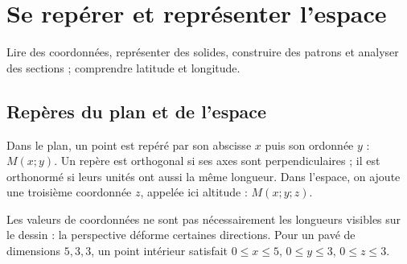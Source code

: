 \documentclass[../cours_3e.tex]{subfiles}
\begin{document}
\setcounter{chapter}{17}
\chapter{Se repérer et représenter l'espace}
\label{ch:espace}
\begin{objectif}
Lire des coordonnées, représenter des solides, construire des patrons et analyser des sections ; comprendre latitude et longitude.
\end{objectif}
\section{Repères du plan et de l'espace}
Dans le plan, un point est repéré par son abscisse $x$ puis son ordonnée $y$ : $M(x;y)$. Un repère est orthogonal si ses axes sont perpendiculaires ; il est orthonormé si leurs unités ont aussi la même longueur.
Dans l'espace, on ajoute une troisième coordonnée $z$, appelée ici altitude : $M(x;y;z)$.
\begin{center}
\end{center}
Les valeurs de coordonnées ne sont pas nécessairement les longueurs visibles sur le dessin : la perspective déforme certaines directions. Pour un pavé de dimensions $5,3,3$, un point intérieur satisfait $0\leq x\leq5$, $0\leq y\leq3$, $0\leq z\leq3$.
\end{document}
